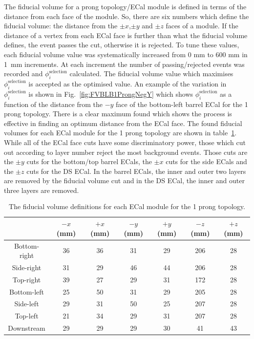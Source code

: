 The fiducial volume for a prong topology/ECal module is defined in terms of the distance from each face of the module.  So, there are six numbers which define the fiducial volume:  the distance from the $\pm x$,$\pm y$ and $\pm z$ faces of a module.  If the distance of a vertex from each ECal face is further than what the fiducial volume defines, the event passes the cut, otherwise it is rejected.  To tune these values,  each fiducial volume value was systematically increased from 0 mm to 600 mm in 1~mm increments.  At each increment the number of passing/rejected events was recorded and $\phi_i^{\textrm{selection}}$ calculated.  The fiducial volume value which maximises $\phi_i^{\textrm{selection}}$ is accepted as the optimised value.  An example of the variation in $\phi_i^{\textrm{selection}}$ is shown in Fig.~\ref{fig:FVBLB1ProngNegY} which shows $\phi_i^{\textrm{selection}}$ as a function of the distance from the $-y$ face of the bottom-left barrel ECal for the 1 prong topology.  There is a clear maximum found which shows the process is effective in finding an optimum distance from the ECal face.
\newline
\newline
The found fiducial volumes for each ECal module for the 1 prong topology are shown in table~\ref{table:FV1Prong}.  While all of the ECal face cuts have some discriminatory power, those which cut out according to layer number reject the most background events.  Those cuts are the $\pm y$ cuts for the bottom/top barrel ECals, the $\pm x$ cuts for the side ECals and the $\pm z$ cuts for the DS ECal.  In the barrel ECals, the inner and outer two layers are removed by the fiducial volume cut and in the DS ECal, the inner and outer three layers are removed.
\begin{table}[t!]
  \begin{tabular}{ c c c c c c c }
     & $-x$ (mm) & $+x$ (mm) & $-y$ (mm) & $+y$ (mm) & $-z$ (mm) & $+z$ (mm)  \\ \hline \hline
    Bottom-right & 36 & 36 & 31 & 29 & 206 & 28 \\
    Side-right & 31 & 29 & 46 & 44 & 206 & 28 \\
    Top-right & 39 & 27 & 29 & 31 & 172 & 28 \\
    Bottom-left & 25 & 50 & 31 & 29 & 205 & 28 \\
    Side-left & 29 & 31 & 50 & 25 & 207 & 28 \\
    Top-left & 21 & 34 & 29 & 31 & 207 & 28 \\
    Downstream & 29 & 29 & 29 & 30 & 41 & 43  \\
  \end{tabular}
  \caption{The fiducial volume definitions for each ECal module for the 1 prong topology.}
  \label{table:FV1Prong}
\end{table}
